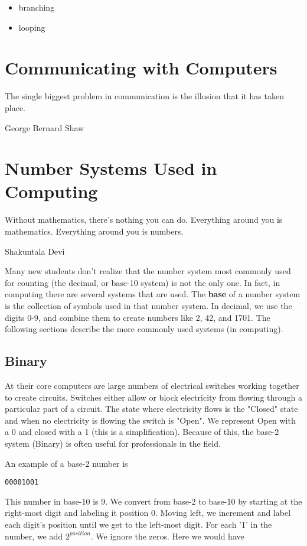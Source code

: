 \documentclass[11pt,fleqn]{book} %
\begin{document}
{\begin{itemize}
\item branching
\item looping
\end{itemize}

\chapter{Communicating with Computers}

\epigraph{The single biggest problem in communication is the illusion that it has taken place.}{George Bernard Shaw}

\chapter{Number Systems Used in Computing}

\epigraph{Without mathematics, there's nothing you can do. Everything around you is mathematics. Everything around you is numbers.}{Shakuntala Devi}

Many new students don't realize that the number system most commonly used for counting (the decimal, or base-10 system) is not the only one.  In fact, in computing there are several systems that are used.  The \textbf{base} of a number system is the collection of symbols used in that number system.  In decimal, we use the digits 0-9, and combine them to create numbers like 2, 42, and 1701.  The following sections describe the more commonly used systems (in computing).

\section{Binary}

At their core computers are large numbers of electrical switches working together to create circuits.  Switches either allow or block electricity from flowing through a particular part of a circuit.  The state where electricity flows is the "Closed" state and when no electricity is flowing the switch is "Open".  We represent Open with a 0 and closed with a 1 (this is a simplification).  Because of this, the base-2 system (Binary) is often useful for professionals in the field.

An example of a base-2 number is

\begin{verbatim}
00001001
\end{verbatim}

This number in base-10 is 9.  We convert from base-2 to base-10 by starting at the right-most digit and labeling it position 0.  Moving left, we increment and label each digit's position until we get to the left-most digit.  For each '1' in the number, we add $ 2^{position} $.  We ignore the zeros.  Here we would have

}
\end{document}
